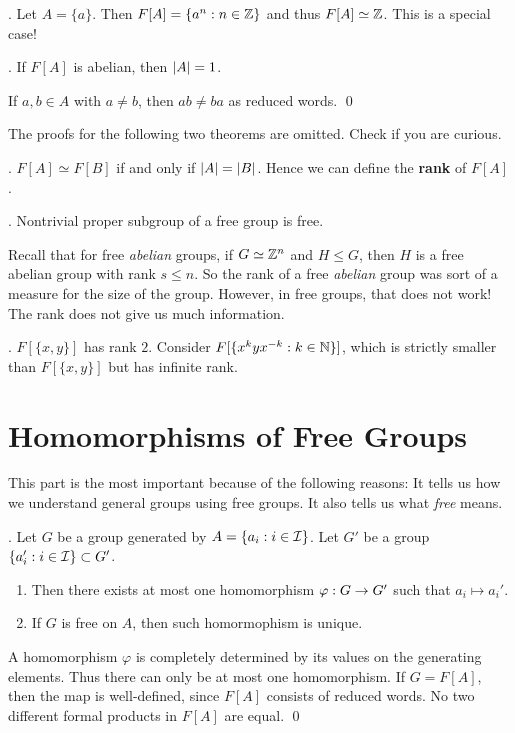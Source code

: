 \ex. Let \(A = \{a\}\). Then \(F[A] = \{a^n : n \in \mathbb{Z}\}\) and thus \(F[A] \simeq \mathbb{Z}\). This is a special case!

\prop. If \(F[A]\) is abelian, then \(\left| A \right| = 1\).

\pf If \(a, b \in A\) with \(a \neq b\), then \(ab \neq ba\) as reduced words. \qed

The proofs for the following two theorems are omitted. Check if you are curious.

\thm. \(F[A] \simeq F[B]\) if and only if \(\left| A \right| = \left| B \right|\). Hence we can define the \textbf{rank} of \(F[A]\).

\thm. Nontrivial proper subgroup of a free group is free.

Recall that for free \textit{abelian} groups, if \(G \simeq \mathbb{Z}^n\) and \(H \leq G\), then \(H\) is a free abelian group with rank \(s \leq n\). So the rank of a free \textit{abelian} group was sort of a measure for the size of the group. However, in free groups, that does not work! The rank does not give us much information.

\ex. \(F[\{x, y\}]\) has rank \(2\). Consider \(F[\{x^k y x^{-k} : k \in \mathbb{N} \}]\), which is strictly smaller than \(F[\{x, y\}]\) but has infinite rank.

\section*{Homomorphisms of Free Groups}

This part is the most important because of the following reasons: It tells us how we understand general groups using free groups. It also tells us what \textit{free} means.

\thm. Let \(G\) be a group generated by \(A = \{a_i : i \in \mathcal{I}\}\). Let \(G'\) be a group \(\{a_i' : i \in \mathcal{I}\} \subset G'\).
\begin{enumerate}
    \item Then there exists at most one homomorphism \(\varphi : G \rightarrow G'\) such that \(a_i \mapsto a_i'\).
    \item If \(G\) is free on \(A\), then such homormophism is unique.
\end{enumerate}

\pf A homomorphism \(\varphi\) is completely determined by its values on the generating elements. Thus there can only be at most one homomorphism. If \(G = F[A]\), then the map is well-defined, since \(F[A]\) consists of reduced words. No two different formal products in \(F[A]\) are equal. \qed

